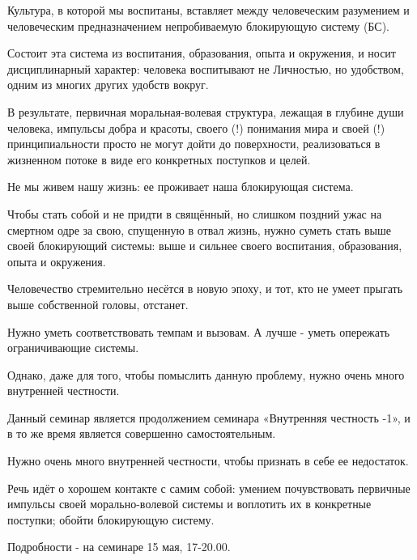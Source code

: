 Культура, в которой мы воспитаны, вставляет между человеческим разумением и
человеческим предназначением непробиваемую блокирующую систему (БС).

Состоит эта система из воспитания, образования, опыта и окружения, и носит
дисциплинарный характер: человека воспитывают не Личностью, но удобством, одним
из многих других удобств вокруг.

В результате, первичная моральная-волевая структура, лежащая в глубине души
человека, импульсы добра и красоты, своего (!) понимания мира и своей (!)
принципиальности просто не могут дойти до поверхности, реализоваться в
жизненном потоке в виде его конкретных поступков и целей.

Не мы живем нашу жизнь: ее проживает наша блокирующая система.

Чтобы стать собой и не придти в свящённый, но слишком поздний ужас на смертном
одре за свою, спущенную в отвал жизнь, нужно суметь стать выше своей
блокирующий системы: выше и сильнее своего воспитания, образования, опыта и
окружения.

Человечество стремительно несётся в новую эпоху, и тот, кто не умеет прыгать выше собственной головы, отстанет.

Нужно уметь соответствовать темпам и вызовам. А лучше - уметь опережать ограничивающие системы. 

Однако, даже для того, чтобы помыслить данную проблему, нужно очень много
внутренней честности.

Данный семинар является продолжением семинара «Внутренняя честность -1», и в то
же время является совершенно самостоятельным.

Нужно очень много внутренней честности, чтобы признать в себе ее недостаток. 

Речь идёт о хорошем контакте с самим собой: умением почувствовать первичные
импульсы своей морально-волевой системы и воплотить их в конкретные поступки;
обойти блокирующую систему.

Подробности - на семинаре 15 мая, 17-20.00.
